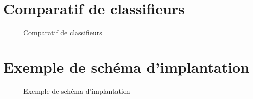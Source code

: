 \section{Comparatif de classifieurs \citep{scikit-learn}}
\begin{figure}[H]
	\centering
	\caption{Comparatif de classifieurs \citep{scikit-learn}}
	\label{comp_clf}
\end{figure}


\section{Exemple de sch\'{e}ma d'implantation}
\begin{figure}[H]
	\centering
	\caption{Exemple de sch\'{e}ma d'implantation}
	\label{schema_implantation}
\end{figure}
